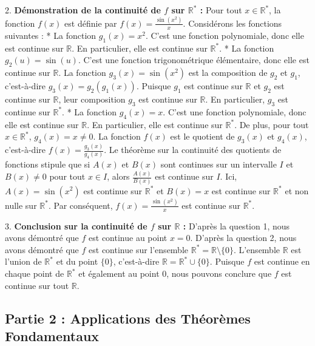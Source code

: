 \documentclass[12pt,a4paper]{report}
\begin{document}
2.  \textbf{Démonstration de la continuité de $f$ sur $\mathbb{R}^*$ :}
    Pour tout $x \in \mathbb{R}^*$, la fonction $f(x)$ est définie par $f(x) = \frac{\sin(x^2)}{x}$.
    Considérons les fonctions suivantes :
    *   La fonction $g_1(x) = x^2$. C'est une fonction polynomiale, donc elle est continue sur $\mathbb{R}$. En particulier, elle est continue sur $\mathbb{R}^*$.
    *   La fonction $g_2(u) = \sin(u)$. C'est une fonction trigonométrique élémentaire, donc elle est continue sur $\mathbb{R}$.
    La fonction $g_3(x) = \sin(x^2)$ est la composition de $g_2$ et $g_1$, c'est-à-dire $g_3(x) = g_2(g_1(x))$. Puisque $g_1$ est continue sur $\mathbb{R}$ et $g_2$ est continue sur $\mathbb{R}$, leur composition $g_3$ est continue sur $\mathbb{R}$. En particulier, $g_3$ est continue sur $\mathbb{R}^*$.
    *   La fonction $g_4(x) = x$. C'est une fonction polynomiale, donc elle est continue sur $\mathbb{R}$. En particulier, elle est continue sur $\mathbb{R}^*$.
    De plus, pour tout $x \in \mathbb{R}^*$, $g_4(x) = x \neq 0$.
    La fonction $f(x)$ est le quotient de $g_3(x)$ et $g_4(x)$, c'est-à-dire $f(x) = \frac{g_3(x)}{g_4(x)}$.
    Le théorème sur la continuité des quotients de fonctions stipule que si $A(x)$ et $B(x)$ sont continues sur un intervalle $I$ et $B(x) \neq 0$ pour tout $x \in I$, alors $\frac{A(x)}{B(x)}$ est continue sur $I$.
    Ici, $A(x) = \sin(x^2)$ est continue sur $\mathbb{R}^*$ et $B(x) = x$ est continue sur $\mathbb{R}^*$ et non nulle sur $\mathbb{R}^*$.
    Par conséquent, $f(x) = \frac{\sin(x^2)}{x}$ est continue sur $\mathbb{R}^*$.

3.  \textbf{Conclusion sur la continuité de $f$ sur $\mathbb{R}$ :}
    D'après la question 1, nous avons démontré que $f$ est continue au point $x=0$.
    D'après la question 2, nous avons démontré que $f$ est continue sur l'ensemble $\mathbb{R}^* = \mathbb{R} \setminus \{0\}$.
    L'ensemble $\mathbb{R}$ est l'union de $\mathbb{R}^*$ et du point $\{0\}$, c'est-à-dire $\mathbb{R} = \mathbb{R}^* \cup \{0\}$.
    Puisque $f$ est continue en chaque point de $\mathbb{R}^*$ et également au point $0$, nous pouvons conclure que $f$ est continue sur tout $\mathbb{R}$.

\subsection{Partie 2 : Applications des Théorèmes Fondamentaux}
\end{document}
